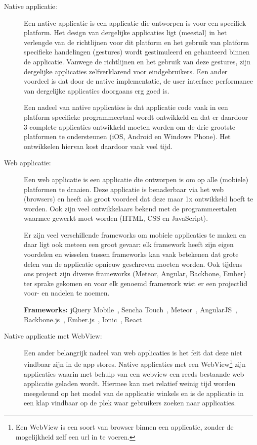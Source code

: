 \begin{description}
\item[Native applicatie:] Een native applicatie is een applicatie die ontworpen is voor een specifiek platform. Het design van dergelijke applicaties ligt (meestal) in het verlengde van de richtlijnen voor dit platform en het gebruik van platform specifieke handelingen (gestures) wordt gestimuleerd en gehanteerd binnen de applicatie. Vanwege de richtlijnen en het gebruik van deze gestures, zijn dergelijke applicaties zelfverklarend voor eindgebruikers. Een ander voordeel is dat door de native implementatie, de user interface performance van dergelijke applicaties doorgaans erg goed is.

Een nadeel van native applicaties is dat applicatie code vaak in een platform specifieke programmeertaal wordt ontwikkeld en dat er daardoor 3 complete applicaties ontwikkeld moeten worden om de drie grootste platformen te ondersteunen (iOS, Android en Windows Phone). Het ontwikkelen hiervan kost daardoor vaak veel tijd.
    
\item[Web applicatie:]
Een web applicatie is een applicatie die ontworpen is om op alle (mobiele) platformen te draaien. Deze applicatie is benaderbaar via het web (browsers) en heeft als groot voordeel dat deze maar 1x ontwikkeld hoeft te worden. Ook zijn veel ontwikkelaars bekend met de programmeertalen waarmee gewerkt moet worden (HTML, CSS en JavaScript).
    
Er zijn veel verschillende frameworks om mobiele applicaties te maken en daar ligt ook meteen een groot gevaar: elk framework heeft zijn eigen voordelen en wisselen tussen frameworks kan vaak betekenen dat grote delen van de applicatie opnieuw geschreven moeten worden. Ook tijdens ons project zijn diverse frameworks (Meteor, Angular, Backbone, Ember) ter sprake gekomen en voor elk genoemd framework wist er een projectlid voor- en nadelen te noemen.
    
\textbf{Frameworks:} jQuery Mobile~\cite{jq-mobile}, Sencha Touch~\cite{sencha}, Meteor~\cite{meteor}, AngularJS~\cite{angular}, Backbone.js~\cite{backbone}, Ember.js~\cite{ember}, Ionic~\cite{ionic}, React~\cite{React}
    
\item[Native applicatie met WebView:] Een ander belangrijk nadeel van web applicaties is het feit dat deze niet vindbaar zijn in de app stores. Native applicaties met een WebView\footnote{Een WebView is een soort van browser binnen een applicatie, zonder de mogelijkheid zelf een url in te voeren.} zijn applicaties waarin met behulp van een webview een reeds bestaande web applicatie geladen wordt. Hiermee kan met relatief weinig tijd worden meegeleund op het model van de applicatie winkels en is de applicatie in een klap vindbaar op de plek waar gebruikers zoeken naar applicaties.
    

\end{description}
